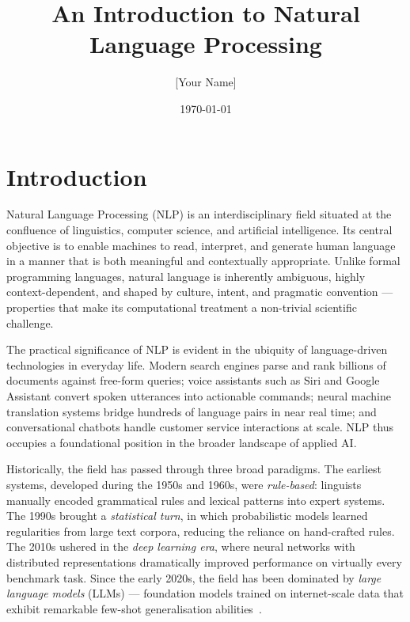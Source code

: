 \documentclass[12pt, a4paper]{article}
\title{\textbf{An Introduction to Natural Language Processing}}
\author{[Your Name]}
\date{\today}
\begin{document}
\maketitle
\thispagestyle{plain}

\section{Introduction}

Natural Language Processing (NLP) is an interdisciplinary field situated at the
confluence of linguistics, computer science, and artificial intelligence. Its
central objective is to enable machines to read, interpret, and generate human
language in a manner that is both meaningful and contextually appropriate. Unlike
formal programming languages, natural language is inherently ambiguous, highly
context-dependent, and shaped by culture, intent, and pragmatic convention ---
properties that make its computational treatment a non-trivial scientific
challenge.

The practical significance of NLP is evident in the ubiquity of language-driven
technologies in everyday life. Modern search engines parse and rank billions of
documents against free-form queries; voice assistants such as Siri and Google
Assistant convert spoken utterances into actionable commands; neural machine
translation systems bridge hundreds of language pairs in near real time; and
conversational chatbots handle customer service interactions at scale. NLP thus
occupies a foundational position in the broader landscape of applied AI.

Historically, the field has passed through three broad paradigms. The earliest
systems, developed during the 1950s and 1960s, were \textit{rule-based}: linguists
manually encoded grammatical rules and lexical patterns into expert systems. The
1990s brought a \textit{statistical turn}, in which probabilistic models learned
regularities from large text corpora, reducing the reliance on hand-crafted
rules. The 2010s ushered in the \textit{deep learning era}, where neural networks
with distributed representations dramatically improved performance on virtually
every benchmark task. Since the early 2020s, the field has been dominated by
\textit{large language models} (LLMs) --- foundation models trained on
internet-scale data that exhibit remarkable few-shot generalisation
abilities~\cite{brown2020gpt3}.


\end{document}
